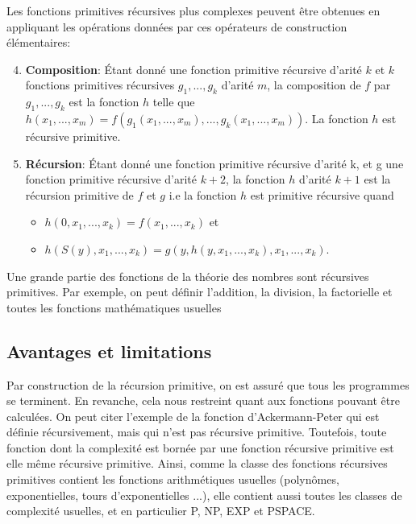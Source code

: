 \documentclass[a4paper, 11pt]{article}
\begin{document}
Les fonctions primitives récursives plus complexes peuvent être obtenues en 
appliquant les opérations données par ces opérateurs de construction élémentaires:

\begin{enumerate}
    \setcounter{enumi}{3}
    \item \textbf{Composition}: Étant donné une fonction primitive récursive 
    d'arité $k$ et $k$ fonctions primitives récursives $g_1, ..., g_k$ d'arité
    $m$, la composition de $f$ par $g_1, ..., g_k$ est la fonction $h$ telle que
    $h(x_1, ..., x_m) = f(g_1(x_1, ..., x_m), ..., g_k(x_1, ..., x_m))$.
    La fonction $h$ est récursive primitive.

    \item \textbf{Récursion}: Étant donné une fonction
    primitive récursive d'arité k, et g une fonction primitive récursive d'arité $k+2$,
    la fonction $h$ d'arité $k+1$ est la récursion primitive \label{recusion primitive}
    de $f$ et $g$ i.e la fonction $h$ est primitive récursive quand
    \begin{itemize}
        \item $h(0, x_1, ..., x_k) = f(x_1, ..., x_k)$ et
        \item $h(S(y), x_1, ..., x_k) = g(y, h(y, x_1, ..., x_k), x_1, ..., x_k)$.
    \end{itemize}
\end{enumerate} 

Une grande partie des fonctions de la théorie des nombres sont récursives 
primitives. Par exemple, on peut définir l'addition, la division, 
la factorielle et toutes les fonctions mathématiques usuelles

\subsection{Avantages et limitations}

Par construction de la récursion primitive, on est assuré que tous les
programmes se terminent. En revanche, cela nous restreint quant aux fonctions
pouvant être calculées. On peut citer l'exemple de la fonction d'Ackermann-Peter qui 
est définie récursivement, mais qui n'est pas récursive primitive.
Toutefois, toute fonction dont la complexité est bornée par une fonction récursive
primitive est elle même récursive primitive. Ainsi, comme la classe des fonctions 
récursives primitives contient les fonctions arithmétiques usuelles 
(polynômes, exponentielles, tours d'exponentielles ...), elle contient aussi toutes 
les classes de complexité usuelles, et en particulier P, NP, EXP et PSPACE.
\end{document}
